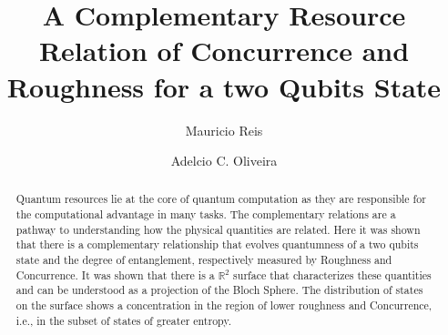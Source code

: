\documentclass[aps,prl,preprint]{revtex4-1}
\begin{document}
	\title{A Complementary Resource Relation of Concurrence and Roughness for a two Qubits State}
	\author{Mauricio Reis} 
	\address{Departamento de F\'isica e Matem\'atica, Universidade Federal de S\~ao
		Jo\~ao Del Rei, C.P. 131, Ouro Branco, MG, 36420 000, Brazil }
	\author{Adelcio C. Oliveira} 
	\address{Departamento de F\'isica e Matem\'atica, Universidade Federal de S\~ao
		Jo\~ao Del Rei, C.P. 131, Ouro Branco, MG, 36420 000, Brazil }
	\begin{abstract}
		Quantum resources lie at the core of quantum computation as they are responsible for the computational advantage in many tasks. The complementary relations are a pathway to understanding how the physical quantities are related. Here it was shown that there is a complementary relationship that evolves quantumness of a two qubits state and the degree of entanglement, respectively measured by Roughness and Concurrence. It was shown that there is a $\mathbb{R}^2$ surface that characterizes these quantities and can be understood as a projection of the Bloch Sphere. The distribution of states on the surface shows a concentration in the region of lower roughness and Concurrence, i.e., in the subset of states of greater entropy.  
	\end{abstract}
	
	\maketitle
	
\end{document}
